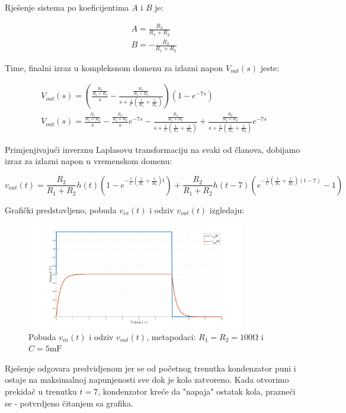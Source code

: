 \documentclass{article}
\begin{document}
    Rješenje sistema po koeficijentima $A$ i $B$ je:

    \begin{equation}
        \begin{split}
            A = \frac{R_2}{R_1 + R_2} \\
            B = -\frac{R_2}{R_1 + R_2}
        \end{split}
    \end{equation}

    Time, finalni izraz u kompleksnom domenu za izlazni napon $V_{out}(s)$ jeste:

    \begin{equation}
        \begin{split}
            V_{out}(s) = \left(\frac{\frac{R_2}{R_1 + R_2}}{s} - \frac{\frac{R_2}{R_1 + R_2}}{s + \frac{1}{C}(\frac{1}{R_1} + \frac{1}{R_2})}\right)(1 - e^{-7s}) \\
            V_{out}(s) = \frac{\frac{R_2}{R_1 + R_2}}{s} - \frac{\frac{R_2}{R_1 + R_2}}{s}e^{-7s} - \frac{\frac{R_2}{R_1 + R_2}}{s + \frac{1}{C}(\frac{1}{R_1} + \frac{1}{R_2})} + \frac{\frac{R_2}{R_1 + R_2}}{s + \frac{1}{C}(\frac{1}{R_1} + \frac{1}{R_2})}e^{-7s}
        \end{split}
    \end{equation}


    Primjenjivajući inverznu Laplasovu transformaciju na svaki od članova, dobijamo izraz za izlazni napon u vremenskom domenu:

    \begin{equation}
        v_{out}(t) = \frac{R_2}{R_1 + R_2}h(t)\left(1 - e^{-\frac{1}{C}(\frac{1}{R_1} + \frac{1}{R_2})t}\right) + \frac{R_2}{R_1 + R_2}h(t-7)\left(e^{-\frac{1}{C}(\frac{1}{R_1} + \frac{1}{R_2})(t-7)} - 1\right)
    \end{equation}

    Grafički predstavljeno, pobuda $v_{in}(t)$ i odziv $v_{out}(t)$ izgledaju:
    
    \begin{figure}[h]   
        \centering
        \includegraphics[width=0.85\textwidth, keepaspectratio]{domaci.png}
        \caption{Pobuda $v_{in}(t)$ i odziv $v_{out}(t)$, metapodaci: $R_1 = R_2 = 100\si{\ohm}$ i $C = 5\si{\milli\farad}$}
    \end{figure}

    
    Rješenje odgovara predvidjenom jer se od početnog trenutka kondenzator puni i ostaje na maksimalnoj napunjenosti sve dok 
    je kolo zatvoreno. Kada otvorimo prekidač u trenutku $t = 7$, kondenzator kreće da "napaja" ostatak kola, prazneći se - 
    potvrdjeno čitanjem sa grafika.
\end{document}
